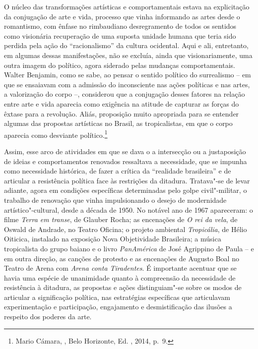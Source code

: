 O núcleo das transformações artísticas e comportamentais estava na
explicitação da conjugação de arte e vida, processo que vinha informando
as artes desde o romantismo, com ênfase no rimbaudiano desregramento de
todos os sentidos como visionária recuperação de uma suposta unidade
humana que teria sido perdida pela ação do ``racionalismo'' da cultura
ocidental. Aqui e ali, entretanto, em algumas dessas manifestações, não
se excluía, ainda que visionariamente, uma outra imagem do político,
agora siderado pelas mudanças comportamentais. Walter Benjamin, como se
sabe, ao pensar o sentido político do surrealismo -- em que se ensaiavam
com a admissão do inconsciente nas ações políticas e nas artes, a
valorização do corpo --, considerou que a conjugação desses fatores na
relação entre arte e vida aparecia como exigência na atitude de capturar
as forças do êxtase para a revolução. Aliás, proposição muito apropriada
para se entender algumas das propostas artísticas no Brasil, as
tropicalistas, em que o corpo aparecia como desviante
político.\footnote{Mario Cámara, {}, Belo Horizonte, Ed.
, 2014, p.~9.}

Assim, esse arco de atividades em que se dava o a intersecção ou a
justaposição de ideias e comportamentos renovados ressaltava a
necessidade, que se impunha como necessidade histórica, de fazer a
crítica da ``realidade brasileira'' e de articular a resistência
política face às restrições da ditadura. Tratava"-se de levar adiante,
agora em condições específicas determinadas pelo golpe civil"-militar, o
trabalho de renovação que vinha impulsionando o desejo de modernidade
artístico"-cultural, desde a década de 1950. No notável ano de 1967
apareceram: o filme \emph{Terra em transe}, de Glauber
Rocha; as encenações de \emph{O rei da vela}, de Oswald de Andrade, no
Teatro Oficina; o projeto ambiental \emph{Tropicália}, de Hélio
Oiticica, instalado na exposição Nova Objetividade Brasileira; a
música tropicalista do grupo baiano e o livro \emph{PanAmérica}
de José Agrippino de Paula -- e em outra direção, as canções de
protesto e as encenações de Augusto Boal no Teatro de Arena com
\emph{Arena conta Tiradentes}. É importante acentuar que se havia uma
espécie de unanimidade quanto à compreensão da necessidade de
resistência à ditadura, as propostas e ações distinguiam"-se sobre os
modos de articular a significação política, nas estratégias específicas
que articulavam experimentação e participação, engajamento e
desmistificação das ilusões a respeito dos poderes da arte.

